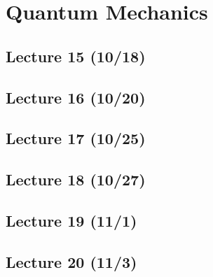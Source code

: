 \documentclass{book}
\theoremstyle{plain}
\begin{document}
  \part{Quantum Mechanics}
  
    \chapter{Lecture 15 (10/18)}

    \chapter{Lecture 16 (10/20)}

    \chapter{Lecture 17 (10/25)}

    \chapter{Lecture 18 (10/27)}

    \chapter{Lecture 19 (11/1)}

    \chapter{Lecture 20 (11/3)}

\end{document}
